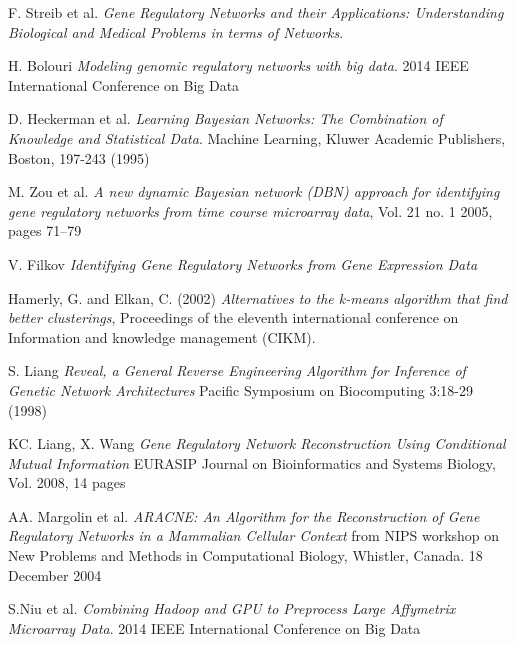 \documentclass[oneside, a4paper, 11pt]{book}
\begin{document}
\begin{thebibliography}{9}

F. Streib et al.
\textit{Gene Regulatory Networks and their Applications: Understanding Biological and Medical Problems in terms of Networks}.

H. Bolouri
\textit{Modeling genomic regulatory networks with big data}.
2014 IEEE International Conference on Big Data

D. Heckerman et al.
\textit{Learning Bayesian Networks: The Combination of Knowledge and Statistical Data}.
Machine Learning, Kluwer Academic Publishers, Boston, 197-243 (1995)

M. Zou et al.
\textit{A new dynamic Bayesian network (DBN) approach for identifying gene regulatory networks from time course microarray data}, Vol. 21 no. 1 2005, pages 71–79

V. Filkov
\textit{Identifying Gene Regulatory Networks from Gene Expression Data}

Hamerly, G. and Elkan, C. (2002)
\textit{Alternatives to the k-means algorithm that find better clusterings}, Proceedings of the eleventh international conference on Information and knowledge management (CIKM).

S. Liang
\textit{Reveal, a General Reverse Engineering Algorithm for Inference of Genetic Network Architectures}
Pacific Symposium on Biocomputing 3:18-29 (1998)

KC. Liang, X. Wang
\textit{Gene Regulatory Network Reconstruction Using Conditional Mutual Information}
EURASIP Journal on Bioinformatics and Systems Biology, Vol. 2008, 14 pages

AA. Margolin et al.
\textit{ARACNE: An Algorithm for the Reconstruction of Gene Regulatory Networks in a Mammalian Cellular Context}
from NIPS workshop on New Problems and Methods in Computational Biology, Whistler, Canada. 18 December 2004

S.Niu et al.
\textit{Combining Hadoop and GPU to Preprocess Large Affymetrix Microarray Data}.
2014 IEEE International Conference on Big Data

\end{thebibliography}
\end{document}
